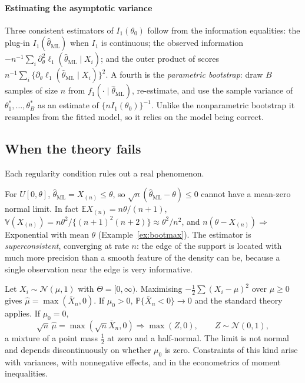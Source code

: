 \documentclass[11pt,a4paper]{article}
\newcommand{\E}{\mathbb{E}}
\newcommand{\V}{\mathbb{V}}
\renewcommand{\P}{\mathbb{P}}
\newcommand{\N}{\mathcal{N}}
\newcommand{\cd}{\Rightarrow}
\newcommand{\Xbar}{\bar X_n}
\newcommand{\thml}{\hat\theta_{\mathrm{ML}}}
\begin{document}
\paragraph{Estimating the asymptotic variance}
Three consistent estimators of $I_1(\theta_0)$ follow from the information equalities: the plug-in $I_1(\thml)$ when $I_1$ is continuous; the observed information $-n^{-1}\sum_i\partial^2_\theta\ell_1(\thml\mid X_i)$; and the outer product of scores $n^{-1}\sum_i\{\partial_\theta\ell_1(\thml\mid X_i)\}^2$. A fourth is the \emph{parametric bootstrap}: draw $B$ samples of size $n$ from $f_1(\cdot\mid\thml)$, re-estimate, and use the sample variance of $\theta_1^*,\ldots,\theta_B^*$ as an estimate of $\{nI_1(\theta_0)\}^{-1}$. Unlike the nonparametric bootstrap it resamples from the fitted model, so it relies on the model being correct.

\subsection{When the theory fails}\label{sec:mlefail}

Each regularity condition rules out a real phenomenon.

\begin{example}
For $U[0,\theta]$, $\thml=X_{(n)}\le\theta$, so $\sqrt n(\thml-\theta)\le0$ cannot have a mean-zero normal limit. In fact $\E X_{(n)}=n\theta/(n+1)$, $\V(X_{(n)})=n\theta^2/\{(n+1)^2(n+2)\}\approx\theta^2/n^2$, and $n(\theta-X_{(n)})\cd$ Exponential with mean $\theta$ (Example~\ref{ex:bootmax}). The estimator is \emph{superconsistent}, converging at rate $n$: the edge of the support is located with much more precision than a smooth feature of the density can be, because a single observation near the edge is very informative.
\end{example}

\begin{example}
Let $X_i\sim\N(\mu,1)$ with $\Theta=[0,\infty)$. Maximising $-\frac12\sum(X_i-\mu)^2$ over $\mu\ge0$ gives $\hat\mu=\max(\Xbar,0)$. If $\mu_0>0$, $\P\{\Xbar<0\}\to0$ and the standard theory applies. If $\mu_0=0$,
\[
\sqrt n\,\hat\mu=\max(\sqrt n\Xbar,0)\cd\max(Z,0),\qquad Z\sim\N(0,1),
\]
a mixture of a point mass $\frac12$ at zero and a half-normal. The limit is not normal and depends discontinuously on whether $\mu_0$ is zero. Constraints of this kind arise with variances, with nonnegative effects, and in the econometrics of moment inequalities.
\end{example}
\end{document}
